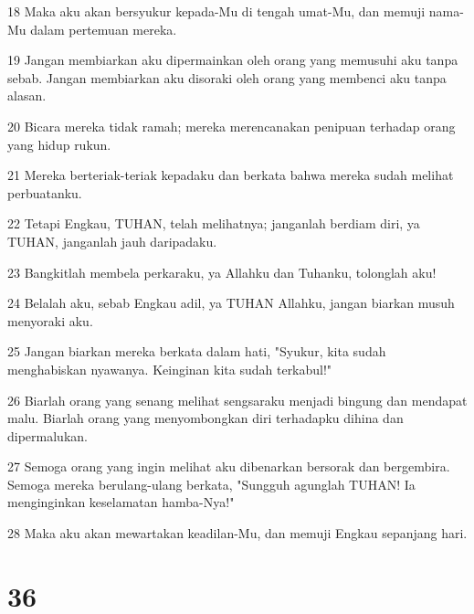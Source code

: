 \par 18 Maka aku akan bersyukur kepada-Mu di tengah umat-Mu, dan memuji nama-Mu dalam pertemuan mereka.
\par 19 Jangan membiarkan aku dipermainkan oleh orang yang memusuhi aku tanpa sebab. Jangan membiarkan aku disoraki oleh orang yang membenci aku tanpa alasan.
\par 20 Bicara mereka tidak ramah; mereka merencanakan penipuan terhadap orang yang hidup rukun.
\par 21 Mereka berteriak-teriak kepadaku dan berkata bahwa mereka sudah melihat perbuatanku.
\par 22 Tetapi Engkau, TUHAN, telah melihatnya; janganlah berdiam diri, ya TUHAN, janganlah jauh daripadaku.
\par 23 Bangkitlah membela perkaraku, ya Allahku dan Tuhanku, tolonglah aku!
\par 24 Belalah aku, sebab Engkau adil, ya TUHAN Allahku, jangan biarkan musuh menyoraki aku.
\par 25 Jangan biarkan mereka berkata dalam hati, "Syukur, kita sudah menghabiskan nyawanya. Keinginan kita sudah terkabul!"
\par 26 Biarlah orang yang senang melihat sengsaraku menjadi bingung dan mendapat malu. Biarlah orang yang menyombongkan diri terhadapku dihina dan dipermalukan.
\par 27 Semoga orang yang ingin melihat aku dibenarkan bersorak dan bergembira. Semoga mereka berulang-ulang berkata, "Sungguh agunglah TUHAN! Ia menginginkan keselamatan hamba-Nya!"
\par 28 Maka aku akan mewartakan keadilan-Mu, dan memuji Engkau sepanjang hari.

\chapter{36}

